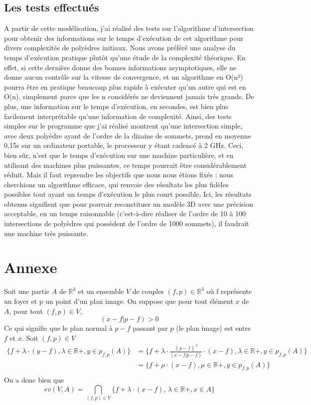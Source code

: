 \documentclass[a4paper]{article}
\newcommand{\norm}[1]{\left\lVert#1\right\rVert}
\begin{document}
      \subsection{Les tests effectués}
      A partir de cette modélisation, j’ai réalisé des tests sur l’algorithme d’intersection pour obtenir des informations sur le temps d’exécution de cet algorithme pour divers complexités de polyèdres initiaux. Nous avons préféré une analyse du temps d’exécution pratique plutôt qu’une étude de la complexité théorique. En effet, si cette dernière donne des bonnes informations asymptotiques, elle ne donne aucun contrôle sur la vitesse de convergence, et un algorithme en O(n²) pourra être en pratique beaucoup plus rapide à exécuter qu’un autre qui est en O(n), simplement parce que les n considérés ne deviennent jamais très grands. De plus, une information sur le temps d’exécution, en secondes, est bien plus facilement interprétable qu’une information de complexité. Ainsi, des tests simples sur le programme que j’ai réalisé montrent qu’une intersection simple, avec deux polyèdre ayant de l’ordre de la dizaine de sommets, prend en moyenne 0,15s sur un ordinateur portable, le processeur y étant cadencé à 2 GHz. Ceci, bien sûr, n’est que le temps d’exécution sur une machine particulière, et en utilisant des machines plus puissantes, ce temps pourrait être considérablement réduit. Mais il faut reprendre les objectifs que nous nous étions fixés : nous cherchions un algorithme efficace, qui renvoie des résultats les plus fidèles possibles tout ayant un temps d’exécution le plus court possible. Ici, les résultats obtenus signifient que pour pouvoir reconstituer un modèle 3D avec une précision acceptable, en un temps raisonnable (c’est-à-dire réaliser de l’ordre de 10 à 100 intersections de polyèdres qui possèdent de l’ordre de 1000 sommets), il faudrait une machine très puissante.

  \appendix
  \section{Annexe}\label{AnnexeA}
    Soit une partie $A$ de $\mathbb{R}^3$ et un ensemble $V$ de couples $(f, p) \in \mathbb{R}^3$ où f représente un foyer et p un point d'un plan image. On suppose que pour tout élément $x$ de $A$, pour tout $(f, p) \in V$,  
    \[(x - f | p - f) > 0\]
    Ce qui signifie que le plan normal à $p - f$ passant par $p$ (le plan image) est entre $f$ et $x$.
    Soit $(f, p) \in V$
    \begin{align*}
      \{f + \lambda \cdot (y - f), \lambda \in \mathbb{R}+, y \in p_{f, p}(A)\}
      &= \{f + \lambda \cdot \frac{\norm{p - f}^2}{(x - f | p - f)} \cdot (x - f), \lambda \in \mathbb{R}+, y \in p_{f, p}(A)\}\\
      &= \{f + \mu \cdot (x - f), \mu \in \mathbb{R}+, y \in p_{f, p}(A)\}\\
    \end{align*}
    On a donc bien que
    \[
      ev(V, A) = \bigcap_{(f, p) \in V} \{f + \lambda \cdot (x - f), \, \lambda \in \mathbb{R}+, x \in A\}
    \]
\end{document}
